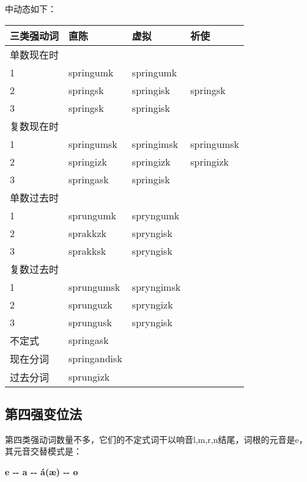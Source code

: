 中动态如下：

\begin{longtable}{llll}
  \toprule
  三类强动词 & 直陈           & 虚拟         & 祈使         \\
  \midrule
  \endhead
  \bottomrule
  \endfoot
  单数现在时 &              &            &            \\
  1     & springumk    & springumk  &            \\
  2     & springsk     & springisk  & springsk   \\
  3     & springsk     & springisk  &            \\
  复数现在时 &              &            &            \\
  1     & springumsk   & springimsk & springumsk \\
  2     & springizk    & springizk  & springizk  \\
  3     & springask    & springisk  &            \\
  单数过去时 &              &            &            \\
  1     & sprungumk    & spryngumk  &            \\
  2     & sprakkzk     & spryngisk  &            \\
  3     & sprakksk     & spryngisk  &            \\
  复数过去时 &              &            &            \\
  1     & sprungumsk   & spryngimsk &            \\
  2     & sprunguzk    & spryngizk  &            \\
  3     & sprungusk    & spryngisk  &            \\
  不定式   & springask    &            &            \\
  现在分词  & springandisk &            &            \\
  过去分词  & sprungizk    &            &            \\
\end{longtable}

\subsection{第四强变位法}\label{第四强变位法}

第四类强动词数量不多，它们的不定式词干以响音l,m,r,n结尾，词根的元音是e，其元音交替模式是：

\textbf{e -\/- a -\/- á(æ) -\/- o}

